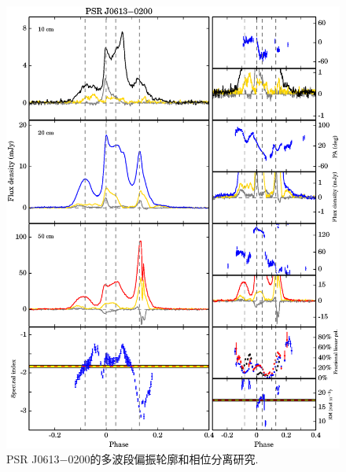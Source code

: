 \begin{figure}
\begin{center}
\includegraphics[width=6 in]{0613.ps}
\caption{PSR J0613$-$0200的多波段偏振轮廓和相位分离研究.}
\label{0613}
\end{center}
\end{figure}

